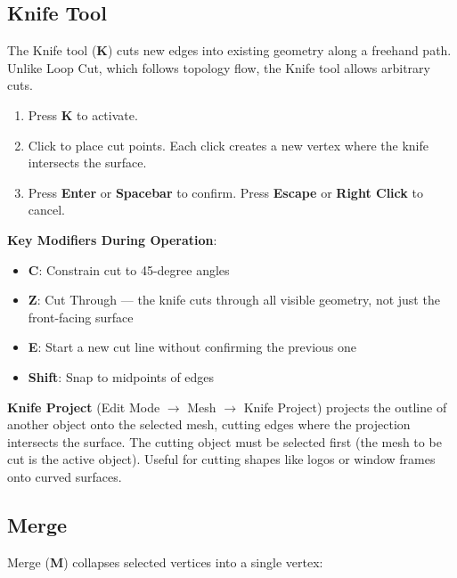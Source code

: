\subsection{Knife Tool}
\label{sec:knife}

The Knife tool (\textbf{K}) cuts new edges into existing geometry along a freehand path. Unlike Loop Cut, which follows topology flow, the Knife tool allows arbitrary cuts.

\begin{enumerate}[leftmargin=2em]
  \item Press \textbf{K} to activate.
  \item Click to place cut points. Each click creates a new vertex where the knife intersects the surface.
  \item Press \textbf{Enter} or \textbf{Spacebar} to confirm. Press \textbf{Escape} or \textbf{Right Click} to cancel.
\end{enumerate}

\textbf{Key Modifiers During Operation}:
\begin{itemize}[leftmargin=2em]
  \item \textbf{C}: Constrain cut to 45-degree angles
  \item \textbf{Z}: Cut Through --- the knife cuts through all visible geometry, not just the front-facing surface
  \item \textbf{E}: Start a new cut line without confirming the previous one
  \item \textbf{Shift}: Snap to midpoints of edges
\end{itemize}

\textbf{Knife Project} (Edit Mode $\rightarrow$ Mesh $\rightarrow$ Knife Project) projects the outline of another object onto the selected mesh, cutting edges where the projection intersects the surface. The cutting object must be selected first (the mesh to be cut is the active object). Useful for cutting shapes like logos or window frames onto curved surfaces.

\subsection{Merge}
\label{sec:merge}

Merge (\textbf{M}) collapses selected vertices into a single vertex:

